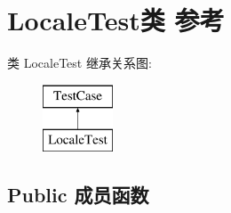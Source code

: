 \hypertarget{class_locale_test}{}\section{Locale\+Test类 参考}
\label{class_locale_test}
类 Locale\+Test 继承关系图\+:\begin{figure}[H]
\begin{center}
\leavevmode
\includegraphics[height=2.000000cm]{class_locale_test}
\end{center}
\end{figure}
\subsection*{Public 成员函数}
